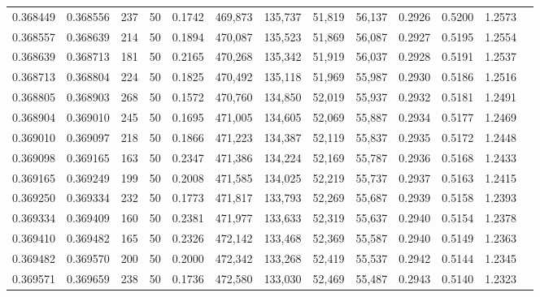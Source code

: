 \begin{tabular}{rrrrrrrrrrrrr}
0.368449 & 0.368556 &   237 &  50 &                                     0.1742 & 469,873 & 135,737 &  51,819 &  56,137 & 0.2926 & 0.5200 & 1.2573 \\
0.368557 & 0.368639 &   214 &  50 &                                     0.1894 & 470,087 & 135,523 &  51,869 &  56,087 & 0.2927 & 0.5195 & 1.2554 \\
0.368639 & 0.368713 &   181 &  50 &                                     0.2165 & 470,268 & 135,342 &  51,919 &  56,037 & 0.2928 & 0.5191 & 1.2537 \\
0.368713 & 0.368804 &   224 &  50 &                                     0.1825 & 470,492 & 135,118 &  51,969 &  55,987 & 0.2930 & 0.5186 & 1.2516 \\
0.368805 & 0.368903 &   268 &  50 &                                     0.1572 & 470,760 & 134,850 &  52,019 &  55,937 & 0.2932 & 0.5181 & 1.2491 \\
0.368904 & 0.369010 &   245 &  50 &                                     0.1695 & 471,005 & 134,605 &  52,069 &  55,887 & 0.2934 & 0.5177 & 1.2469 \\
0.369010 & 0.369097 &   218 &  50 &                                     0.1866 & 471,223 & 134,387 &  52,119 &  55,837 & 0.2935 & 0.5172 & 1.2448 \\
0.369098 & 0.369165 &   163 &  50 &                                     0.2347 & 471,386 & 134,224 &  52,169 &  55,787 & 0.2936 & 0.5168 & 1.2433 \\
0.369165 & 0.369249 &   199 &  50 &                                     0.2008 & 471,585 & 134,025 &  52,219 &  55,737 & 0.2937 & 0.5163 & 1.2415 \\
0.369250 & 0.369334 &   232 &  50 &                                     0.1773 & 471,817 & 133,793 &  52,269 &  55,687 & 0.2939 & 0.5158 & 1.2393 \\
0.369334 & 0.369409 &   160 &  50 &                                     0.2381 & 471,977 & 133,633 &  52,319 &  55,637 & 0.2940 & 0.5154 & 1.2378 \\
0.369410 & 0.369482 &   165 &  50 &                                     0.2326 & 472,142 & 133,468 &  52,369 &  55,587 & 0.2940 & 0.5149 & 1.2363 \\
0.369482 & 0.369570 &   200 &  50 &                                     0.2000 & 472,342 & 133,268 &  52,419 &  55,537 & 0.2942 & 0.5144 & 1.2345 \\
0.369571 & 0.369659 &   238 &  50 &                                     0.1736 & 472,580 & 133,030 &  52,469 &  55,487 & 0.2943 & 0.5140 & 1.2323 \\

\end{tabular}
